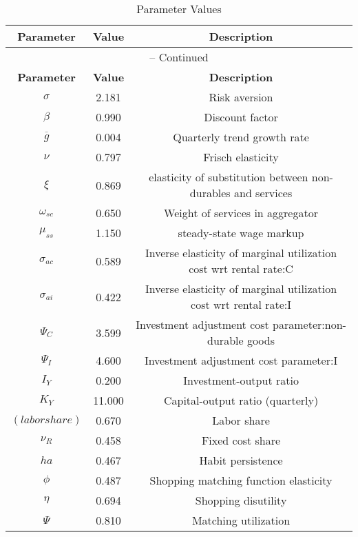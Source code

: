 \begin{center}
\begin{longtable}{ccc}
\caption{Parameter Values}\\%
\toprule%
\multicolumn{1}{c}{\textbf{Parameter}} &
\multicolumn{1}{c}{\textbf{Value}} &
 \multicolumn{1}{c}{\textbf{Description}}\\%
\midrule%
\endfirsthead
\multicolumn{3}{c}{{\tablename} \thetable{} -- Continued}\\%
\midrule%
\multicolumn{1}{c}{\textbf{Parameter}} &
\multicolumn{1}{c}{\textbf{Value}} &
  \multicolumn{1}{c}{\textbf{Description}}\\%
\midrule%
\endhead
${\sigma}$ 	 & 	 2.181 	 & 	 Risk aversion\\
${\beta}$ 	 & 	 0.990 	 & 	 Discount factor\\
${\overline{g}}$ 	 & 	 0.004 	 & 	 Quarterly trend growth rate\\
$\nu$ 	 & 	 0.797 	 & 	 Frisch elasticity\\
$\xi$ 	 & 	 0.869 	 & 	 elasticity of substitution between non-durables and services\\
$\omega_{sc}$ 	 & 	 0.650 	 & 	 Weight of services in aggregator\\
$\mu_{ss}$ 	 & 	 1.150 	 & 	 steady-state wage markup\\
${\sigma_{ac}}$ 	 & 	 0.589 	 & 	 Inverse elasticity of marginal utilization cost wrt rental rate:C\\
${\sigma_{ai}}$ 	 & 	 0.422 	 & 	 Inverse elasticity of marginal utilization cost wrt rental rate:I\\
${\Psi_{C}}$ 	 & 	 3.599 	 & 	 Investment adjustment cost parameter:non-durable goods\\
${\Psi_I}$ 	 & 	 4.600 	 & 	 Investment adjustment cost parameter:I\\
${I_Y}$ 	 & 	 0.200 	 & 	 Investment-output ratio\\
${K_Y}$ 	 & 	 11.000 	 & 	 Capital-output ratio (quarterly)\\
$(labor share)$ 	 & 	 0.670 	 & 	 Labor share\\
${\nu_R}$ 	 & 	 0.458 	 & 	 Fixed cost share\\
${ha}$ 	 & 	 0.467 	 & 	 Habit persistence\\
${\phi}$ 	 & 	 0.487 	 & 	 Shopping matching function elasticity\\
${\eta}$ 	 & 	 0.694 	 & 	 Shopping disutility\\
${\Psi}$ 	 & 	 0.810 	 & 	 Matching utilization\\

\end{longtable}
\end{center}
